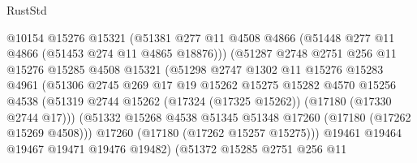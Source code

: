 \begin{lexlean}{RustStd}
\begin{coremodule}
                              @10154
                              @15276
                              @15321
                              (@51381
                                @277
                                @11
                                @4508
                                @4866
                                (@51448 @277 @11 @4866 (@51453 @274 @11 @4865 @18876)))
                              (@51287
                                @2748
                                @2751
                                @256
                                @11
                                @15276
                                @15285
                                @4508
                                @15321
                                (@51298
                                  @2747
                                  @1302
                                  @11
                                  @15276
                                  @15283
                                  @4961
                                  (@51306
                                    @2745
                                    @269
                                    @17
                                    @19
                                    @15262
                                    @15275
                                    @15282
                                    @4570
                                    @15256
                                    @4538
                                    (@51319
                                      @2744
                                      @15262
                                      (@17324 (@17325 @15262))
                                      (@17180 (@17330 @2744 @17)))
                                    (@51332
                                      @15268
                                      @4538
                                      @51345
                                      @51348
                                      @17260
                                      (@17180 (@17262 @15269 @4508)))
                                    @17260
                                    (@17180 (@17262 @15257 @15275)))
                                  @19461
                                  @19464
                                  @19467
                                  @19471
                                  @19476
                                  @19482)
                                (@51372
                                  @15285
                                  @2751
                                  @256
                                  @11

\end{coremodule}
\end{lexlean}
